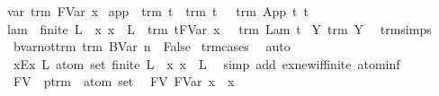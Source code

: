 \begin{isabellebody}
var{\isacharcolon}\ {\isachardoublequoteopen}trm\ {\isacharparenleft}FVar\ x{\isacharparenright}{\isachardoublequoteclose}\ {\isacharbar}\isanewline
app{\isacharcolon}\ {\isachardoublequoteopen}{\isasymlbrakk}\ trm\ t{}\ {\isacharsemicolon}\ trm\ t{}\ {\isasymrbrakk}\ {\isasymLongrightarrow}\ trm\ {\isacharparenleft}App\ t{}\ t{}{\isacharparenright}{\isachardoublequoteclose}\ {\isacharbar}\isanewline
lam{\isacharcolon}\ {\isachardoublequoteopen}{\isasymlbrakk}\ finite\ L\ {\isacharsemicolon}\ {\isacharparenleft}{\isasymAnd}x{\isachardot}\ x\ {\isasymnotin}\ L\ {\isasymLongrightarrow}\ trm\ {\isacharparenleft}t{\isacharcircum}{\isacharparenleft}FVar\ x{\isacharparenright}{\isacharparenright}{\isacharparenright}\ {\isasymrbrakk}\ {\isasymLongrightarrow}\ trm\ {\isacharparenleft}Lam\ t{\isacharparenright}{\isachardoublequoteclose}\ {\isacharbar}\isanewline
Y{\isacharcolon}\ {\isachardoublequoteopen}trm\ {\isacharparenleft}Y\ {\isasymsigma}{\isacharparenright}{\isachardoublequoteclose}\isanewline
{}\isamarkupfalse%
\ trm{\isachardot}simps\isanewline
\isanewline
{}\isamarkupfalse%
\ bvar{\isacharunderscore}not{\isacharunderscore}trm{\isacharcolon}\ {\isachardoublequoteopen}trm\ {\isacharparenleft}BVar\ n{\isacharparenright}\ {\isasymLongrightarrow}\ False{\isachardoublequoteclose}\isanewline
%
\isadelimproof
%
\endisadelimproof
%
\isatagproof
{}\isamarkupfalse%
\ trm{\isachardot}cases\ \isamarkupfalse%
\ auto%
\endisatagproof
{\isafoldproof}%
%
\isadelimproof
\isanewline
%
\endisadelimproof
\isanewline
{}\isamarkupfalse%
\ x{\isacharunderscore}Ex{\isacharcolon}\ {\isachardoublequoteopen}{\isasymAnd}L{\isacharcolon}{\isacharcolon}\ atom\ set{\isachardot}\ finite\ L\ {\isasymLongrightarrow}\ {\isasymexists}x{\isachardot}\ x\ {\isasymnotin}\ L{\isachardoublequoteclose}\ \isanewline
%
\isadelimproof
%
\endisadelimproof
%
\isatagproof
{}\isamarkupfalse%
\ {\isacharparenleft}simp\ add{\isacharcolon}\ ex{\isacharunderscore}new{\isacharunderscore}if{\isacharunderscore}finite\ atom{\isacharunderscore}inf{\isacharparenright}%
\endisatagproof
{\isafoldproof}%
%
\isadelimproof
%
\endisadelimproof
%
\isamarkuptrue%
\isamarkupfalse%
\ FV\ {\isacharcolon}{\isacharcolon}\ {\isachardoublequoteopen}ptrm\ {\isasymRightarrow}\ atom\ set{\isachardoublequoteclose}\ \ \isanewline
{\isachardoublequoteopen}FV\ {\isacharparenleft}FVar\ x{\isacharparenright}\ {\isacharequal}\ {\isacharbraceleft}x{\isacharbraceright}{\isachardoublequoteclose}\ {\isacharbar}\isanewline

\end{isabellebody}
